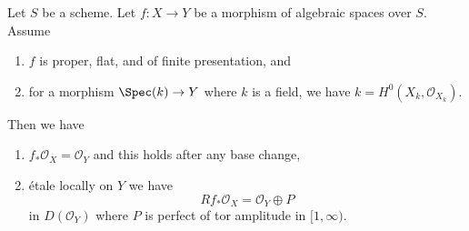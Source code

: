 \begin{lemma}
\label{lemma-proper-flat-h0}
Let $S$ be a scheme.
Let $f : X \to Y$ be a morphism of algebraic spaces over $S$. Assume
\begin{enumerate}
\item $f$ is proper, flat, and of finite presentation, and
\item for a morphism $\Spec(k) \to Y$ where $k$ is a field, we have
$k = H^0(X_k, \mathcal{O}_{X_k})$.
\end{enumerate}
Then we have
\begin{enumerate}
\item[(a)] $f_*\mathcal{O}_X = \mathcal{O}_Y$ and
this holds after any base change,
\item[(b)] \'etale locally on $Y$ we have
$$
Rf_*\mathcal{O}_X = \mathcal{O}_Y \oplus P
$$
in $D(\mathcal{O}_Y)$
where $P$ is perfect of tor amplitude in $[1, \infty)$.
\end{enumerate}
\end{lemma}

